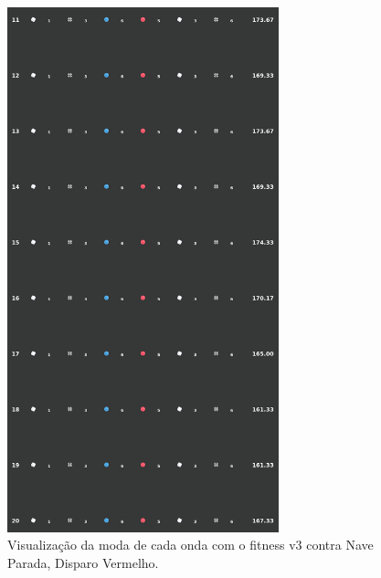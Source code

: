 \begin{figure}[H]
  \centering
  \includegraphics[width=0.7\textwidth]{figuras/ss/ss_redstill_ai_mode_2_2.png}
  \caption{Visualização da moda de cada onda com o fitness v3 contra Nave Parada, Disparo Vermelho.}
  \label{fig:ss-moda-rs-2-2}
\end{figure}

